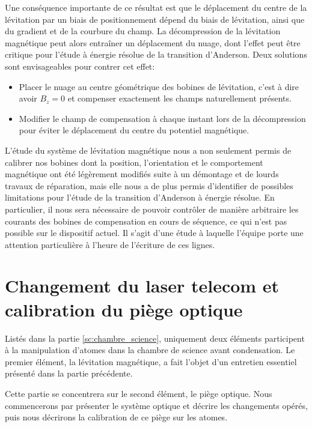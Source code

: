 Une conséquence importante de ce résultat est que le déplacement du centre de la lévitation par un biais de positionnement dépend du biais de lévitation, ainsi que du gradient et de la courbure du champ. La décompression de la lévitation magnétique peut alors entraîner un déplacement du nuage, dont l'effet peut être critique pour l'étude à énergie résolue de la transition d'Anderson. Deux solutions sont envisageables pour contrer cet effet: 
\begin{itemize}
\item[\textendash] Placer le nuage au centre géométrique des bobines de lévitation, c'est à dire avoir $B_z=0$ et compenser exactement les champs naturellement présents. 
\item[\textendash] Modifier le champ de compensation à chaque instant lors de la décompression pour éviter le déplacement du centre du potentiel magnétique.
\end{itemize}

L'étude du système de lévitation magnétique nous a non seulement permis de calibrer nos bobines dont la position, l'orientation et le comportement magnétique ont été légèrement modifiés suite à un démontage et de lourds travaux de réparation, mais elle nous a de plus permis d'identifier de possibles limitations pour l'étude de la transition d'Anderson à énergie résolue. En particulier, il nous sera nécessaire de pouvoir contrôler de manière arbitraire les courants des bobines de compensation en cours de séquence, ce qui n'est pas possible sur le dispositif actuel. Il s'agit d'une étude à laquelle l'équipe porte une attention particulière à l'heure de l'écriture de ces lignes.












\section{Changement du laser telecom et calibration du piège optique}
Listés dans la partie \ref{sc:chambre_science}, uniquement deux éléments participent à la manipulation d'atomes dans la chambre de science avant condensation. Le premier élément, la lévitation magnétique, a fait l'objet d'un entretien essentiel présenté dans la partie précédente. 

Cette partie se concentrera sur le second élément, le piège optique. Nous commencerons par présenter le système optique et décrire les changements opérés, puis nous décrirons la calibration de ce piège sur les atomes.

